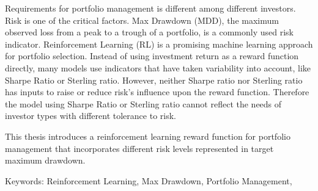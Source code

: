 \begin{abstracten}
Requirements for portfolio management is different among different investors. Risk is one of the critical factors. Max Drawdown (MDD), the maximum observed loss from a peak to a trough of a portfolio, is a commonly used risk indicator. Reinforcement Learning (RL) is a promising machine learning approach for portfolio selection. Instead of using investment return as a reward function directly, many models use indicators that have taken variability into account, like Sharpe Ratio \cite{Sharpe49} or Sterling ratio. However, neither Sharpe ratio nor Sterling ratio has inputs to raise or reduce risk's influence upon the reward function. Therefore the model using Sharpe Ratio \cite{Sharpe49} or Sterling ratio cannot reflect the needs of investor types with different tolerance to risk.

\par
This thesis introduces a reinforcement learning reward function for portfolio management that incorporates different risk levels represented in target maximum drawdown.

\noindent
Keywords: Reinforcement Learning, Max Drawdown, Portfolio Management,
\end{abstracten}
